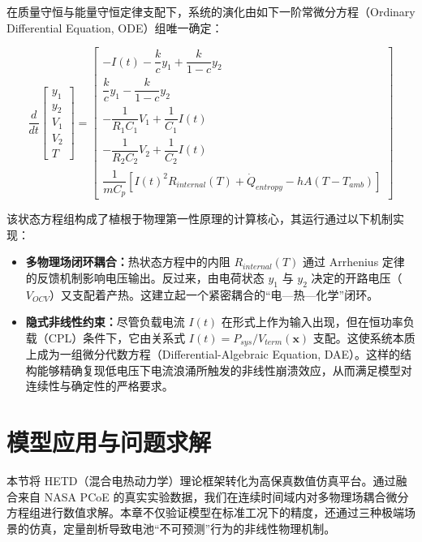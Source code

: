 \documentclass[11pt,a4paper]{ctexart}
\begin{document}
在质量守恒与能量守恒定律支配下，系统的演化由如下一阶常微分方程（Ordinary Differential Equation, ODE）组唯一确定：

\begin{equation}
\frac{d}{dt}
\begin{bmatrix}
y_1 \\ y_2 \\ V_1 \\ V_2 \\ T
\end{bmatrix}
=
\begin{bmatrix}
-I(t) - \dfrac{k}{c}y_1 + \dfrac{k}{1-c}y_2 \\[10pt]
\dfrac{k}{c}y_1 - \dfrac{k}{1-c}y_2 \\[10pt]
-\dfrac{1}{R_1C_1}V_1 + \dfrac{1}{C_1}I(t) \\[10pt]
-\dfrac{1}{R_2C_2}V_2 + \dfrac{1}{C_2}I(t) \\[10pt]
\dfrac{1}{mC_p}\left[I(t)^2 R_{internal}(T) + \dot{Q}_{entropy} - hA\left(T - T_{amb}\right)\right]
\end{bmatrix}
\end{equation}

该状态方程组构成了植根于物理第一性原理的计算核心，其运行通过以下机制实现：

\begin{itemize}[leftmargin=1.6em,itemsep=0.4em]
\item \textbf{多物理场闭环耦合：}热状态方程中的内阻 $R_{internal}(T)$ 通过 Arrhenius 定律的反馈机制影响电压输出。反过来，由电荷状态 $y_1$ 与 $y_2$ 决定的开路电压（$V_{OCV}$）又支配着产热。这建立起一个紧密耦合的“电—热—化学”闭环。

\item \textbf{隐式非线性约束：}尽管负载电流 $I(t)$ 在形式上作为输入出现，但在恒功率负载（CPL）条件下，它由关系式 $I(t) = P_{sys}/V_{term}(\mathbf{x})$ 支配。这使系统本质上成为一组微分代数方程（Differential-Algebraic Equation, DAE）。这样的结构能够精确复现低电压下电流浪涌所触发的非线性崩溃效应，从而满足模型对连续性与确定性的严格要求。
\end{itemize}

\section{模型应用与问题求解}

本节将 HETD（混合电热动力学）理论框架转化为高保真数值仿真平台。通过融合来自 NASA PCoE 的真实实验数据，我们在连续时间域内对多物理场耦合微分方程组进行数值求解。本章不仅验证模型在标准工况下的精度，还通过三种极端场景的仿真，定量剖析导致电池“不可预测”行为的非线性物理机制。
\end{document}
